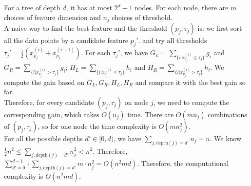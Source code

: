 \documentclass{article}
\begin{document}
    \subsection{}\label{2.1}
    For a tree of depth $d$, it has at most $2^d-1$ nodes. For each node, there are $m$ choices of feature dimension and $n_j$ choices of threshold.
    \vspace{10pt}\\
    A naive way to find the best feature and the threshold $(p_j,\tau_j)$ is: we first sort all the data points by a candidate feature $p_j'$.
    and try all thresholds $\tau_j'=\frac{1}{2}\left(x_{p_j}^{(i)}+x_{p_j}^{(i+1)}\right)$. For each $\tau_j'$, we have
    $G_L=\sum_{\{i|x_{p_j}^{(i)}\leq\tau_j\}} g_i$ and $G_R=\sum_{\{i|x_{p_j}^{(i)}>\tau_j\}} g_i$; $H_L=\sum_{\{i|x_{p_j}^{(i)}\leq\tau_j\}} h_i$ and $H_R=\sum_{\{i|x_{p_j}^{(i)}>\tau_j\}} h_i$.
    We compute the gain based on $G_L, G_R, H_L, H_R$ and compare it with the best gain so far.
    \vspace{10pt}\\
    Therefore, for every candidate $(p_j,\tau_j)$ on node $j$, we need to compute the corresponding gain, which takes $O(n_j)$ time.
    There are $O(mn_j)$ combinations of $(p_j,\tau_j)$, so for one node the time complexity is $O(mn_j^2)$.
    \vspace{10pt}\\
    For all the possible depths $d'\in[0,d)$, we have $\sum_{j,\text{depth}(j)=d'}n_j=n$. 
    We know $\frac{1}{2}n^2\leq\sum_{j,\text{depth}(j)=d'}n_j^2<n^2$. 
    Therefore, $\sum_{d'=0}^{d-1}\cdot\sum_{j,\text{depth}(j)=d'}m\cdot n_j^2=O(n^2md)$.
    Therefore, the computational complexity is $O(n^2md)$.
\end{document}
